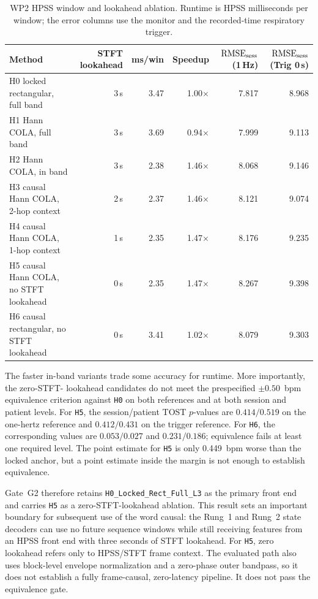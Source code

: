 \begin{table}[htbp]
  \centering
  \footnotesize
  \setlength{\tabcolsep}{4.5pt}
  \caption{WP2 HPSS window and lookahead ablation. Runtime is HPSS milliseconds per window;
  the error columns use the monitor and the recorded-time respiratory trigger.}
  \label{tab:ch4_wp2}
  \begin{tabularx}{\textwidth}{@{}>{\raggedright\arraybackslash}Xrrrrr@{}}
    \toprule
    Method & STFT lookahead & ms/win & Speedup & $\mathrm{RMSE}_{\mathrm{sess}}$ (1\,Hz) & $\mathrm{RMSE}_{\mathrm{sess}}$ (Trig 0\,s) \\
    \midrule
    H0 locked rectangular, full band & 3\,s & 3.47 & 1.00$\times$ & 7.817 & 8.968 \\
    H1 Hann COLA, full band & 3\,s & 3.69 & 0.94$\times$ & 7.999 & 9.113 \\
    H2 Hann COLA, in band & 3\,s & 2.38 & 1.46$\times$ & 8.068 & 9.146 \\
    H3 causal Hann COLA, 2-hop context & 2\,s & 2.37 & 1.46$\times$ & 8.121 & 9.074 \\
    H4 causal Hann COLA, 1-hop context & 1\,s & 2.35 & 1.47$\times$ & 8.176 & 9.235 \\
    H5 causal Hann COLA, no STFT lookahead & 0\,s & 2.35 & 1.47$\times$ & 8.267 & 9.398 \\
    H6 causal rectangular, no STFT lookahead & 0\,s & 3.41 & 1.02$\times$ & 8.079 & 9.303 \\
    \bottomrule
  \end{tabularx}
\end{table}

The faster in-band variants trade some accuracy for runtime. More importantly, the zero-STFT-
lookahead candidates do not meet the prespecified $\pm0.50$~bpm equivalence criterion against
\texttt{H0} on both references and at both session and patient levels. For \texttt{H5}, the
session/patient TOST $p$-values are $0.414/0.519$ on the one-hertz reference and $0.412/0.431$
on the trigger reference. For \texttt{H6}, the corresponding values are $0.053/0.027$ and
$0.231/0.186$; equivalence fails at least one required level. The point estimate for \texttt{H5}
is only 0.449~bpm worse than the locked anchor, but a point estimate inside the margin is not
enough to establish equivalence.

Gate~G2 therefore retains \texttt{H0\_Locked\_Rect\_Full\_L3} as the primary front end and carries
\texttt{H5} as a zero-STFT-lookahead ablation. This result sets an important boundary for
subsequent use of the word causal: the Rung~1 and Rung~2 state decoders can use no future
sequence windows while still receiving features from an HPSS front end with three seconds of
STFT lookahead. For \texttt{H5}, zero lookahead refers only to HPSS/STFT frame context. The
evaluated path also uses block-level envelope normalization and a zero-phase outer bandpass, so
it does not establish a fully frame-causal, zero-latency pipeline. It does not pass the
equivalence gate.

